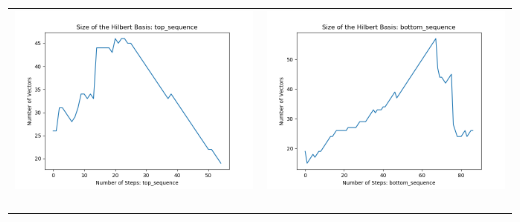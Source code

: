 \documentclass[10pt]{article}
\begin{document}
\begin{tabular}{c|c}
\begin{minipage}{.45\textwidth}
\includegraphics[width=\textwidth]{"DATA/4d/5 generators 2 bound H/top_sequence SIZE"}
\end{minipage} &
\begin{minipage}{.45\textwidth}
\includegraphics[width=\textwidth]{"DATA/4d/5 generators 2 bound H bottomup/bottom_sequence SIZE"}
\end{minipage} \\ \\
\hline \\\begin{minipage}{.45\textwidth}

\end{minipage}
\end{tabular}
\end{document}
